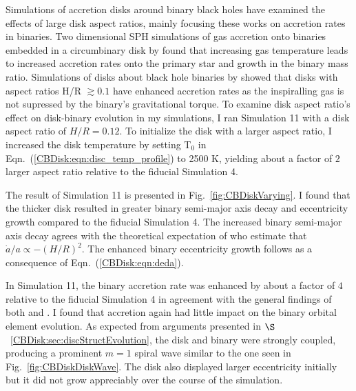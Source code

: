 Simulations of accretion disks around binary black holes have examined the effects of large disk aspect ratios, mainly focusing these works on accretion rates in binaries.  
Two dimensional SPH simulations of gas accretion onto binaries embedded in a circumbinary disk by \citet{Young2015} found that increasing gas temperature 
leads to increased accretion rates onto the primary star and growth in the binary mass ratio.  Simulations of disks about black hole binaries by \citet{Ragusa2016} 
showed that disks with aspect ratios H/R $\gtrsim 0.1$ have enhanced accretion rates as the inspiralling gas is not supressed by the binary's gravitational 
torque.  To examine disk aspect ratio's effect on disk-binary evolution in my simulations, I ran Simulation 11 with a disk aspect ratio of $H/R = 0.12$.  To 
initialize the disk with a larger aspect ratio, I increased the disk temperature by setting T$_0$ in Eqn.~(\ref{CBDisk:eqn:disc_temp_profile}) to 2500 K, yielding 
about a factor of $2$ larger aspect ratio relative to the fiducial Simulation 4.

The result of Simulation 11 is presented in Fig.~\ref{fig:CBDiskVarying}.  I found that the thicker disk resulted in greater binary semi-major axis decay and 
eccentricity growth compared to the fiducial Simulation 4.  The increased binary semi-major axis decay agrees with the theoretical expectation of 
\citet{Artymowicz1996b,Artymowicz2000} who estimate that $\dot{a}/a \propto -(H/R)^2$.  The enhanced binary eccentricity growth follows as a consequence of Eqn.~(\ref{CBDisk:eqn:deda}).

In Simulation 11, the binary accretion rate was enhanced by about a factor of $4$ relative to the fiducial Simulation 4 in agreement with the general 
findings of both \citet{Young2015} and \citet{Ragusa2016}.  I found that accretion again had little impact on the binary orbital element evolution.  As expected from arguments presented in $\S$~\ref{CBDisk:sec:discStructEvolution}, the disk and binary were strongly coupled, producing a prominent $m = 1$ spiral wave similar to the one seen in Fig.~\ref{fig:CBDiskDiskWave}.  The disk also displayed larger eccentricity initially but it did not grow appreciably over the course of the simulation.  
	
